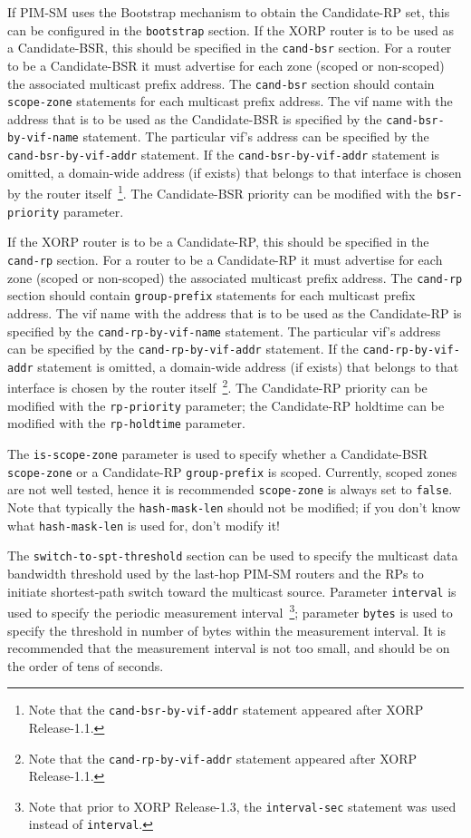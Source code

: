 If PIM-SM uses the Bootstrap mechanism to obtain the Candidate-RP set,
this can be configured in the {\tt bootstrap} section.
If the XORP router is to be used as a Candidate-BSR, this should be
specified in the {\tt cand-bsr} section.
For a router to be a Candidate-BSR it must advertise for
each zone (scoped or non-scoped) the associated multicast prefix address.
The {\tt cand-bsr} section should contain {\tt scope-zone} statements for each
multicast prefix address.
The vif name with the address that is to be used as the Candidate-BSR
is specified by the {\tt cand-bsr-by-vif-name} statement.
The particular vif's address can be specified by the
{\tt cand-bsr-by-vif-addr} statement. If the
{\tt cand-bsr-by-vif-addr} statement is omitted, a domain-wide
address (if exists) that belongs to that interface is chosen by the router
itself~\footnote{Note that the {\tt cand-bsr-by-vif-addr} statement
appeared after XORP Release-1.1.}.
The Candidate-BSR priority can be modified with the {\tt bsr-priority}
parameter.

If the XORP router is to be a Candidate-RP, this should be specified
in the {\tt cand-rp} section.
For a router to be a Candidate-RP it must advertise for
each zone (scoped or non-scoped) the associated multicast prefix address.
The {\tt cand-rp} section should contain {\tt group-prefix} statements
for each multicast prefix address.
The vif name with the address that is to be used as the Candidate-RP
is specified by the {\tt cand-rp-by-vif-name} statement.
The particular vif's address can be specified by the
{\tt cand-rp-by-vif-addr} statement. If the
{\tt cand-rp-by-vif-addr} statement is omitted, a domain-wide
address (if exists) that belongs to that interface is chosen by the router
itself~\footnote{Note that the {\tt cand-rp-by-vif-addr} statement
appeared after XORP Release-1.1.}.
The Candidate-RP priority can be modified with the
{\tt rp-priority} parameter; the Candidate-RP holdtime can be modified
with the {\tt rp-holdtime} parameter.

The {\tt is-scope-zone} parameter is used to specify whether a
Candidate-BSR {\tt scope-zone} or a Candidate-RP {\tt group-prefix} is
scoped. Currently, 
scoped zones are not well tested, hence it is recommended {\tt scope-zone}
is always set to {\tt false}.
Note that typically the {\tt hash-mask-len} should not be modified; if you
don't know what {\tt hash-mask-len} is used for, don't modify it!

The {\tt switch-to-spt-threshold} section can be used to specify the
multicast data bandwidth threshold used by the last-hop PIM-SM routers
and the RPs to initiate shortest-path switch toward the multicast source.
Parameter {\tt interval} is used to specify the periodic measurement
interval~\footnote{Note that prior to XORP Release-1.3, the
{\tt interval-sec} statement was used instead of {\tt interval}.};
parameter {\tt bytes} is used to specify the threshold in number of bytes
within the measurement interval. It is recommended that the measurement
interval is not too small, and should be on the order of tens of seconds.

